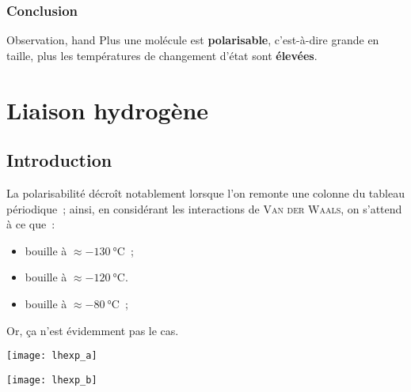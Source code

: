 \documentclass[../main/main.tex]{subfiles}
\begin{document}
\subsubsection{Conclusion}
\begin{tror}{Observation, hand}
    Plus une molécule est \textbf{polarisable}, c'est-à-dire grande en taille,
    plus les températures de changement d'état sont \textbf{élevées}.
\end{tror}

\section{Liaison hydrogène}
\subsection{Introduction}
La polarisabilité décroît notablement lorsque l'on remonte une colonne du
tableau périodique~; ainsi, en considérant les interactions de \textsc{Van der
Waals}, on s'attend à ce que~:
\begin{itemize}
    \item {} bouille à $\approx \SI{-130}{\degreeCelsius}$~;
    \item {} bouille à $\approx \SI{-120}{\degreeCelsius}$.
    \item {} bouille à $\approx \SI{-80}{\degreeCelsius}$~;
\end{itemize}
Or, ça n'est évidemment pas le cas.

\begin{minipage}[t]{0.45\linewidth}
    \begin{center}
        \texttt{[image: lhexp\_a]}
        \captionsetup{justification=centering}
    \end{center}
\end{minipage}
\hfill
\begin{minipage}[t]{0.45\linewidth}
    \begin{center}
        \texttt{[image: lhexp\_b]}
        \captionsetup{justification=centering}
    \end{center}
\end{minipage}
\end{document}
